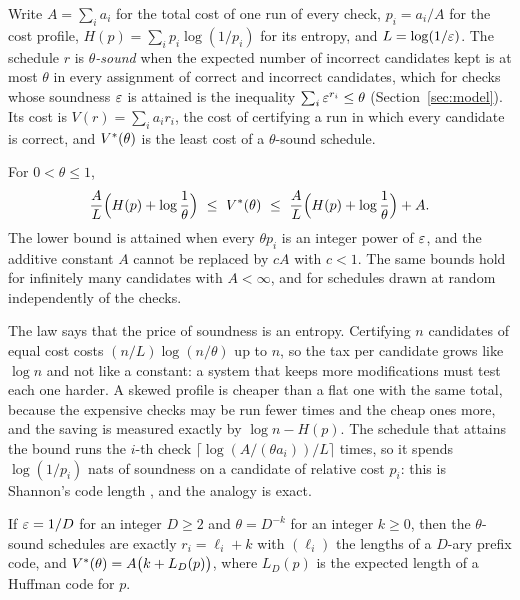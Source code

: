 Write $A=\sum_{i}a_{i}$ for the total cost of one run of every check, $p_{i}=a_{i}/A$ for the cost profile, $H(p)=\sum_{i}p_{i}\log(1/p_{i})$ for its entropy, and $L=\log(1/\varepsilon)$. The schedule $r$ is \emph{$\theta$-sound} when the expected number of incorrect candidates kept is at most $\theta$ in every assignment of correct and incorrect candidates, which for checks whose soundness $\varepsilon$ is attained is the inequality $\sum_{i}\varepsilon^{r_{i}}\le\theta$ (Section~\ref{sec:model}). Its cost is $V(r)=\sum_{i}a_{i}r_{i}$, the cost of certifying a run in which every candidate is correct, and $V^{*}(\theta)$ is the least cost of a $\theta$-sound schedule.

\begin{mainthm}\label{thm:A}
For $0<\theta\le1$,
\begin{equation}\label{eq:entropylaw}
\frac{A}{L}\Bigl(H(p)+\log\frac1\theta\Bigr)\ \le\ \Vs(\theta)\ \le\ \frac{A}{L}\Bigl(H(p)+\log\frac1\theta\Bigr)+A .
\end{equation}
The lower bound is attained when every $\theta p_{i}$ is an integer power of $\varepsilon$, and the additive constant $A$ cannot be replaced by $cA$ with $c<1$. The same bounds hold for infinitely many candidates with $A<\infty$, and for schedules drawn at random independently of the checks.
\end{mainthm}

The law says that the price of soundness is an entropy. Certifying $n$ candidates of equal cost costs $(n/L)\log(n/\theta)$ up to $n$, so the tax per candidate grows like $\log n$ and not like a constant: a system that keeps more modifications must test each one harder. A skewed profile is cheaper than a flat one with the same total, because the expensive checks may be run fewer times and the cheap ones more, and the saving is measured exactly by $\log n-H(p)$. The schedule that attains the bound runs the $i$-th check $\lceil\log(A/(\theta a_{i}))/L\rceil$ times, so it spends $\log(1/p_{i})$ nats of soundness on a candidate of relative cost $p_{i}$: this is Shannon's code length \cite{Sha48}, and the analogy is exact.

\begin{mainthm}\label{thm:C}
If $\varepsilon=1/D$ for an integer $D\ge2$ and $\theta=D^{-k}$ for an integer $k\ge0$, then the $\theta$-sound schedules are exactly $r_{i}=\ell_{i}+k$ with $(\ell_{i})$ the lengths of a $D$-ary prefix code, and $V^{*}(\theta)=A\bigl(k+L_{D}(p)\bigr)$, where $L_{D}(p)$ is the expected length of a Huffman code for $p$.
\end{mainthm}

